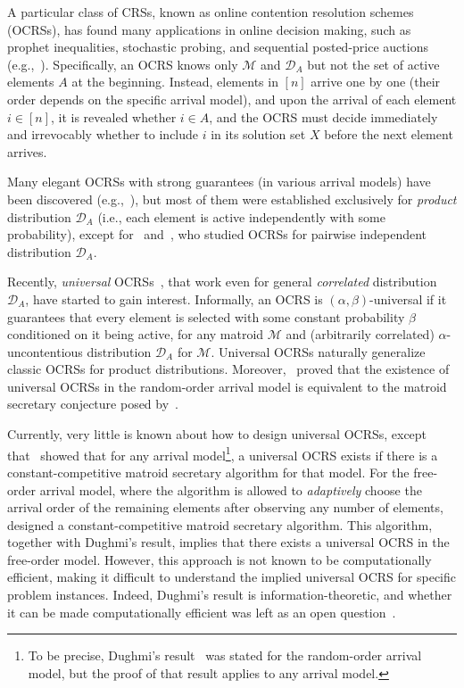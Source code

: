 \documentclass[11pt]{article}
\newcommand{\D}{\mathcal D}
\newcommand{\M}{{\mathcal M}}
\begin{document}
A particular class of CRSs, known as online contention resolution schemes (OCRSs), has found many applications in online decision making, such as prophet inequalities, stochastic probing, and sequential posted-price auctions (e.g.,~\citet{gupta2013stochastic,feldman2021online,adamczyk2018random}). Specifically, an OCRS knows only $\M$ and $\D_A$ but not the set of active elements $A$ at the beginning. Instead, elements in $[n]$ arrive one by one (their order depends on the specific arrival model), and upon the arrival of each element $i\in[n]$, it is revealed whether $i\in A$, and the OCRS must decide immediately and irrevocably whether to include $i$ in its solution set $X$ before the next element arrives.

Many elegant OCRSs with strong guarantees (in various arrival models) have been discovered (e.g.,~\citet{chekuri2014submodular,feldman2021online,adamczyk2018random,lee2018optimal,fu2024samplebased}), but most of them were established exclusively for \emph{product} distribution $\D_A$ (i.e., each element is active independently with some probability), except for~\citet{dughmi2024limitations} and~\citet{gupta2024pairwise}, who studied OCRSs for pairwise independent distribution $\D_A$.

Recently, \emph{universal} OCRSs~\citep{dughmi2020outer}, that work even for general \emph{correlated} distribution $\D_A$, have started to gain interest. Informally, an OCRS is $(\alpha,\beta)$-universal if it guarantees that every element is selected with some constant probability $\beta$ conditioned on it being active, for any matroid $\M$ and (arbitrarily correlated) $\alpha$-uncontentious distribution $\D_A$ for $\M$. Universal OCRSs naturally generalize classic OCRSs for product distributions. Moreover,~\citet{dughmi2020outer,dughmi2022matroid} proved that the existence of universal OCRSs in the random-order arrival model is equivalent to the matroid secretary conjecture posed by~\citet{babaioff2007matroids}.

Currently, very little is known about how to design universal OCRSs, except that~\citet{dughmi2020outer} showed that for any arrival model\footnote{To be precise, Dughmi's result~\citep[Theorem 4.1]{dughmi2020outer} was stated for the random-order arrival model, but the proof of that result applies to any arrival model.}, a universal OCRS exists if there is a constant-competitive matroid secretary algorithm for that model. For the free-order arrival model, where the algorithm is allowed to \emph{adaptively} choose the arrival order of the remaining elements after observing any number of elements,~\citet{jaillet2013advances} designed a constant-competitive matroid secretary algorithm. This algorithm, together with Dughmi's result, implies that there exists a universal OCRS in the free-order model. However, this approach is not known to be computationally efficient, making it difficult to understand the implied universal OCRS for specific problem instances. Indeed, Dughmi's result is information-theoretic, and whether it can be made computationally efficient was left as an open question~\citep[Section 6]{dughmi2020outer}.
\end{document}

